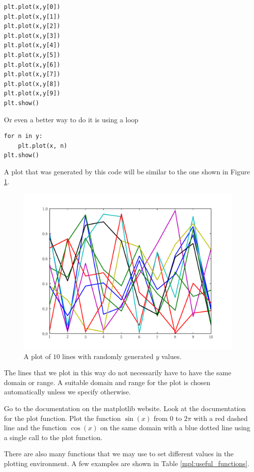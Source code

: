 \begin{lstlisting}
plt.plot(x,y[0])
plt.plot(x,y[1])
plt.plot(x,y[2])
plt.plot(x,y[3])
plt.plot(x,y[4])
plt.plot(x,y[5])
plt.plot(x,y[6])
plt.plot(x,y[7])
plt.plot(x,y[8])
plt.plot(x,y[9])
plt.show()
\end{lstlisting}
Or even a better way to do it is using a loop
\begin{lstlisting}
for n in y:
    plt.plot(x, n)
plt.show()
\end{lstlisting}

A plot that was generated by this code will be similar to the one shown in Figure \ref{mpl:statemachineexample}.

\begin{figure}
\includegraphics[width=\textwidth]{statemachine.pdf}
\caption{A plot of $10$ lines with randomly generated $y$ values.}
\label{mpl:statemachineexample}
\end{figure}

The lines that we plot in this way do not necessarily have to have the same domain or range.
A suitable domain and range for the plot is chosen automatically unless we specify otherwise.

\begin{problem}
Go to the documentation on the matplotlib website.
Look at the documentation for the plot function.
Plot the function $\sin(x)$ from $0$ to $2\pi$ with a red dashed line and the function $\cos(x)$ on the same domain with a blue dotted line using a single call to the plot function.
\end{problem}

There are also many functions that we may use to set different values in the plotting environment.
A few examples are shown in Table \ref{mpl:useful_functions}.

